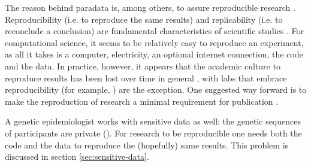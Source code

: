 
The reason behind paradata is, among others,
to assure reproducible research \cite{huvila2022improving}.
Reproducibility (i.e. to reproduce the same results) 
and replicability (i.e. to reconclude a conclusion)
are fundamental characteristics of scientific studies \cite{patil2019visual}.
For computational science, it seems to be relatively easy to 
reproduce an experiment, as all it takes is a computer, electricity,
an optional internet connection, the code and the data.
In practice, however, it appears that 
the academic culture to reproduce results 
has been lost over time in general \cite{peng2011reproducible},
with labs that embrace reproducibility (for example, \cite{barba2016hard})
are the exception.
One suggested way forward is to make the reproduction of 
research a minimal requirement for publication \cite{peng2011reproducible}.


A genetic epidemiologist works with sensitive data as well:
the genetic sequences of participants are private (\cite{clayton2019law}).
For research to be reproducible one needs both the code and the data
to reproduce the (hopefully) same results.
This problem is discussed in section \ref{sec:sensitive-data}.

